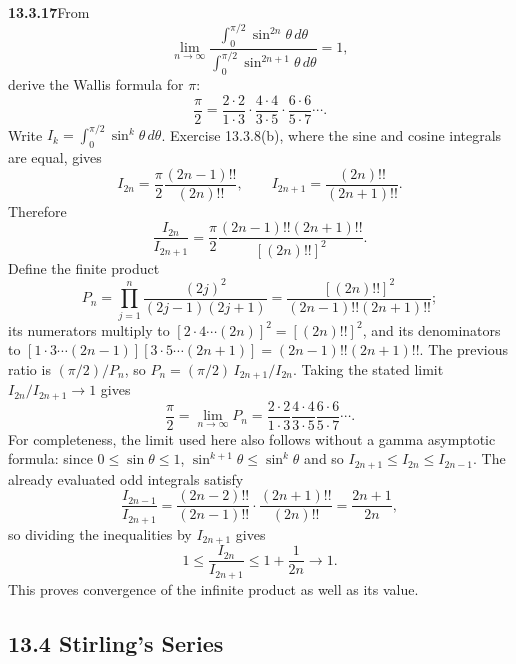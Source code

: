 \par\bigskip
\noindent\textbf{13.3.17}\quad From
\[
\lim_{n\to\infty}
\frac{\displaystyle\int_{0}^{\pi/2}\sin^{2n}\theta\,d\theta}
{\displaystyle\int_{0}^{\pi/2}\sin^{2n+1}\theta\,d\theta}=1,
\]
derive the Wallis formula for $\pi$:
\[
\frac{\pi}{2}=\frac{2\cdot2}{1\cdot3}\cdot\frac{4\cdot4}{3\cdot5}
\cdot\frac{6\cdot6}{5\cdot7}\cdots.
\]
\solution
Write $I_k=\int_0^{\pi/2}\sin^k\theta\,d\theta$.
Exercise 13.3.8(b), where the sine and cosine integrals are
equal, gives
\[
I_{2n}=\frac\pi2\frac{(2n-1)!!}{(2n)!!},
\qquad I_{2n+1}=\frac{(2n)!!}{(2n+1)!!}.
\]
Therefore
\[
\frac{I_{2n}}{I_{2n+1}}
=\frac\pi2\frac{(2n-1)!!(2n+1)!!}{[(2n)!!]^2}.
\]
Define the finite product
\[
P_n=\prod_{j=1}^n\frac{(2j)^2}{(2j-1)(2j+1)}
=\frac{[(2n)!!]^2}{(2n-1)!!(2n+1)!!};
\]
its numerators multiply to $[2\cdot4\cdots(2n)]^2=[(2n)!!]^2$, and
its denominators to $[1\cdot3\cdots(2n-1)][3\cdot5\cdots(2n+1)]
=(2n-1)!!(2n+1)!!$.  The previous ratio is $(\pi/2)/P_n$, so
$P_n=(\pi/2)\,I_{2n+1}/I_{2n}$.  Taking the stated limit
$I_{2n}/I_{2n+1}\to1$ gives
\[
\boxed{\frac\pi2=\lim_{n\to\infty}P_n
=\frac{2\cdot2}{1\cdot3}\frac{4\cdot4}{3\cdot5}
\frac{6\cdot6}{5\cdot7}\cdots}.
\]
For completeness, the limit used here also follows without a
gamma asymptotic formula: since $0\le\sin\theta\le1$,
$\sin^{k+1}\theta\le\sin^k\theta$ and so
$I_{2n+1}\le I_{2n}\le I_{2n-1}$.  The already evaluated
odd integrals satisfy
\[
\frac{I_{2n-1}}{I_{2n+1}}
=\frac{(2n-2)!!}{(2n-1)!!}\cdot\frac{(2n+1)!!}{(2n)!!}
=\frac{2n+1}{2n},
\]
so dividing the inequalities by $I_{2n+1}$ gives
\[
1\le\frac{I_{2n}}{I_{2n+1}}\le1+\frac1{2n}\longrightarrow1.
\]
This proves convergence of the infinite product as well as its value.


\subsection*{13.4 Stirling's Series}

